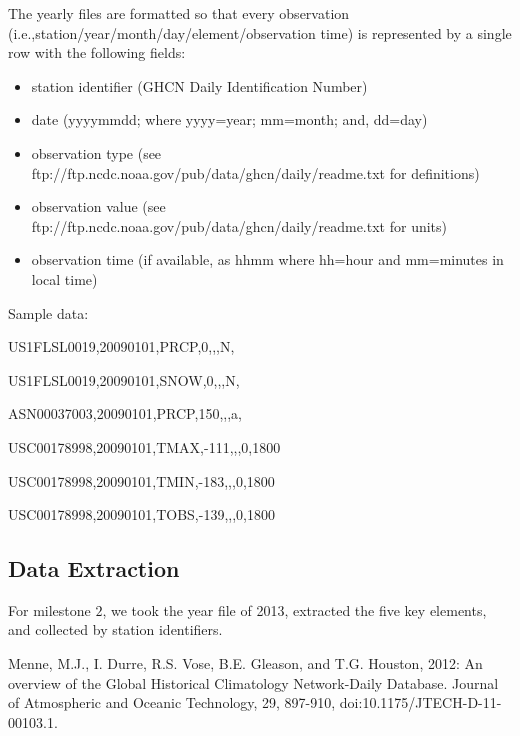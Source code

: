 The yearly files are formatted so that every observation 
(i.e.,station/year/month/day/element/observation time) is represented by a single row 
with the following fields:
\begin{itemize}
	\item  station identifier (GHCN Daily Identification Number)
 	\item date (yyyymmdd; where yyyy=year; mm=month; and, dd=day)
 	\item observation type (see ftp://ftp.ncdc.noaa.gov/pub/data/ghcn/daily/readme.txt for definitions)
 	\item observation value (see ftp://ftp.ncdc.noaa.gov/pub/data/ghcn/daily/readme.txt for units)
 	\item observation time (if available, as hhmm where hh=hour and mm=minutes in local time)
 \end{itemize}
 
Sample data:

US1FLSL0019,20090101,PRCP,0,,,N,
 
US1FLSL0019,20090101,SNOW,0,,,N,

ASN00037003,20090101,PRCP,150,,,a,

USC00178998,20090101,TMAX,-111,,,0,1800

USC00178998,20090101,TMIN,-183,,,0,1800

USC00178998,20090101,TOBS,-139,,,0,1800

 \subsection{Data Extraction}
 
 For milestone $2$, we took the year file of 2013, extracted the five key elements, and collected by station identifiers. 
 

{\color{red} Menne, M.J., I. Durre, R.S. Vose, B.E. Gleason, and T.G. Houston, 2012:  An overview 
of the Global Historical Climatology Network-Daily Database.  Journal of Atmospheric 
and Oceanic Technology, 29, 897-910, doi:10.1175/JTECH-D-11-00103.1.}